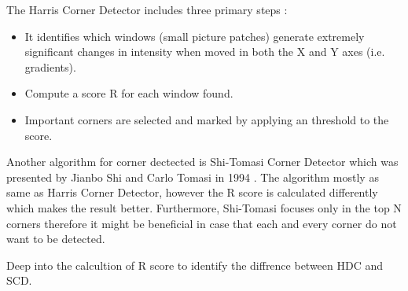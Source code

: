 \documentclass[a4paper, 12pt]{article}
\begin{document}
The Harris Corner Detector includes three primary steps \citep{ryu2011formula}:

\begin{itemize}
    \item It identifies which windows (small picture patches) generate extremely significant changes in intensity when moved in both the X and Y axes (i.e. gradients).
    \item Compute a score R for each window found.
    \item Important corners are selected and marked by applying an threshold to the score.
\end{itemize}

Another algorithm for corner dectected is Shi-Tomasi Corner Detector which was presented by Jianbo Shi and Carlo Tomasi in 1994 \citep{shi1994good}. The algorithm mostly as same as Harris Corner Detector, however the R score is calculated differently which makes the result better. Furthermore, Shi-Tomasi focuses only in the top N corners therefore it might be beneficial in case that each and every corner do not want to be detected.

Deep into the calcultion of R score to identify the diffrence between HDC and SCD.

\begin{table}[ht!]
    \centering
    \def\arraystretch{1}%
    \caption{HDC vs SDC Scoring function}
    \label{table:1}
\end{table}
\end{document}
